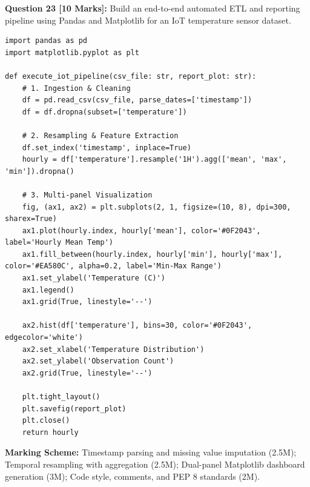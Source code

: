 \noindent\textbf{Question 23 [10 Marks]:} Build an end-to-end automated ETL and reporting pipeline using Pandas and Matplotlib for an IoT temperature sensor dataset.
\begin{solutionbox}
\begin{lstlisting}
import pandas as pd
import matplotlib.pyplot as plt

def execute_iot_pipeline(csv_file: str, report_plot: str):
    # 1. Ingestion & Cleaning
    df = pd.read_csv(csv_file, parse_dates=['timestamp'])
    df = df.dropna(subset=['temperature'])
    
    # 2. Resampling & Feature Extraction
    df.set_index('timestamp', inplace=True)
    hourly = df['temperature'].resample('1H').agg(['mean', 'max', 'min']).dropna()
    
    # 3. Multi-panel Visualization
    fig, (ax1, ax2) = plt.subplots(2, 1, figsize=(10, 8), dpi=300, sharex=True)
    ax1.plot(hourly.index, hourly['mean'], color='#0F2043', label='Hourly Mean Temp')
    ax1.fill_between(hourly.index, hourly['min'], hourly['max'], color='#EA580C', alpha=0.2, label='Min-Max Range')
    ax1.set_ylabel('Temperature (C)')
    ax1.legend()
    ax1.grid(True, linestyle='--')
    
    ax2.hist(df['temperature'], bins=30, color='#0F2043', edgecolor='white')
    ax2.set_xlabel('Temperature Distribution')
    ax2.set_ylabel('Observation Count')
    ax2.grid(True, linestyle='--')
    
    plt.tight_layout()
    plt.savefig(report_plot)
    plt.close()
    return hourly
\end{lstlisting}
\end{solutionbox}
\begin{markingrubric}
\textbf{Marking Scheme:} Timestamp parsing and missing value imputation (2.5M); Temporal resampling with aggregation (2.5M); Dual-panel Matplotlib dashboard generation (3M); Code style, comments, and PEP 8 standards (2M).
\end{markingrubric}
